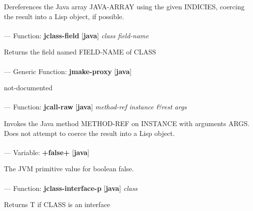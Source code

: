 \begin{adjustwidth}{5em}{5em}
Dereferences the Java array JAVA-ARRAY using the given INDICIES, coercing the result into a Lisp object, if possible.
\end{adjustwidth}

\paragraph{}
\label{JAVA:JCLASS-FIELD}
--- Function: \textbf{jclass-field} [\textbf{java}] \textit{class field-name}

\begin{adjustwidth}{5em}{5em}
Returns the field named FIELD-NAME of CLASS
\end{adjustwidth}

\paragraph{}
\label{JAVA:JMAKE-PROXY}
--- Generic Function: \textbf{jmake-proxy} [\textbf{java}] \textit{}

\begin{adjustwidth}{5em}{5em}
not-documented
\end{adjustwidth}

\paragraph{}
\label{JAVA:JCALL-RAW}
--- Function: \textbf{jcall-raw} [\textbf{java}] \textit{method-ref instance \&rest args}

\begin{adjustwidth}{5em}{5em}
Invokes the Java method METHOD-REF on INSTANCE with arguments ARGS. Does not attempt to coerce the result into a Lisp object.
\end{adjustwidth}

\paragraph{}
\label{JAVA:+FALSE+}
--- Variable: \textbf{+false+} [\textbf{java}] \textit{}

\begin{adjustwidth}{5em}{5em}
The JVM primitive value for boolean false.
\end{adjustwidth}

\paragraph{}
\label{JAVA:JCLASS-INTERFACE-P}
--- Function: \textbf{jclass-interface-p} [\textbf{java}] \textit{class}

\begin{adjustwidth}{5em}{5em}
Returns T if CLASS is an interface
\end{adjustwidth}

